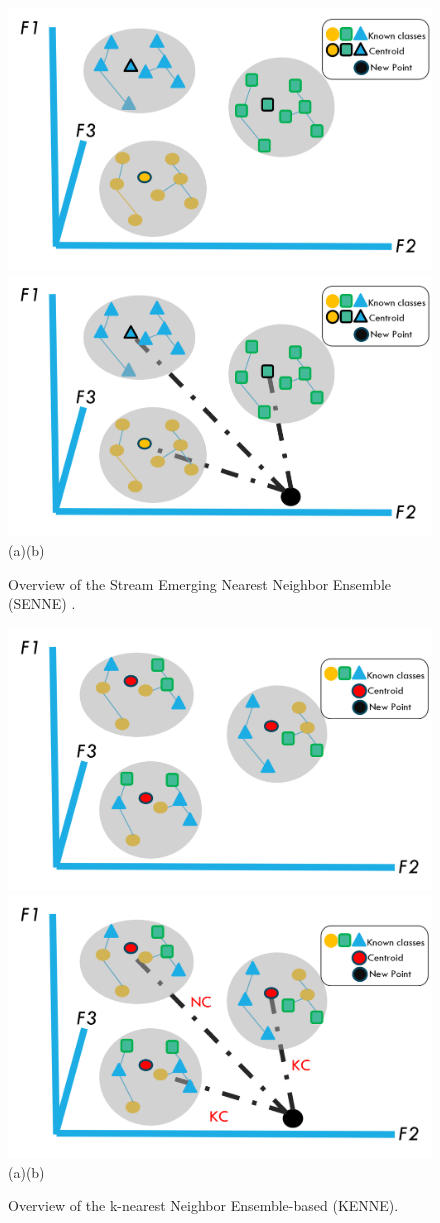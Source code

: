 \begin{figure}[!ht]
    \begin{center}
        \includegraphics[width=.45\textwidth]{3_State-of-the-art/fig/senne0.png} 
        \includegraphics[width=.45\textwidth]{3_State-of-the-art/fig/senne.png} 
        (a)\hspace{6.5cm}(b)
    \end{center}
    \caption{Overview of the Stream Emerging Nearest Neighbor Ensemble (SENNE) \cite{zhu2020semi}.}
    \label{fig:SENNE}
    \end{figure}
    \vline
    \begin{figure}[!ht]    
        \begin{center}
            \includegraphics[width=.45\textwidth]{3_State-of-the-art/fig/kenne0.png} 
            \includegraphics[width=.45\textwidth]{3_State-of-the-art/fig/kenne.png}
            (a)\hspace{6.5cm}(b)
            \end{center}
    
        \caption{Overview of the k-nearest Neighbor Ensemble-based \cite{zhang2022knnens} (KENNE).}
        \label{fig:KENNE}
        \end{figure}
        
